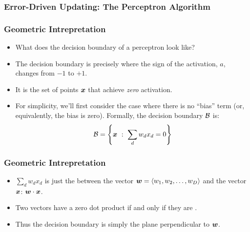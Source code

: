 \documentclass[trans]{beamer}
\begin{document}
\begin{frame}
  \frametitle{Error-Driven Updating: The Perceptron Algorithm}
\end{frame}

\begin{frame}
  \frametitle{Geometric Intrepretation}
\begin{itemize}
\item
What does the
decision boundary of a perceptron look like?  
\item The decision boundary
is precisely where the sign of the activation, $a$, changes from $-1$
to $+1$.  
\item It is the set of points ${\boldsymbol{x}}$ that achieve
\emph{zero} activation.
\item
  For simplicity, we'll first consider the case where there
is no ``bias'' term (or, equivalently, the bias is zero).  Formally,
the decision boundary $\mathcal{B}$ is:
\begin{equation}
\mathcal{B} = \left\{ {\boldsymbol{x}} ~:~ \sum_d w_d x_d = 0 \right\}
\end{equation}
\end{itemize}
\end{frame}
\begin{frame}
  \frametitle{Geometric Intrepretation}
\begin{itemize}
\item
$\sum_d w_d x_d$ is
just the  between the vector ${\boldsymbol{w}} = \langle w_1,
w_2, \dots, w_D \rangle$ and the vector ${\boldsymbol{x}}$: 
${\boldsymbol{w}} \cdot {\boldsymbol{x}}$.  
\item  Two vectors have a zero dot product if and only if
they are .  
\item Thus the decision boundary is simply the plane
perpendicular to ${\boldsymbol{w}}$.
\end{itemize}
\end{frame}
\end{document}
